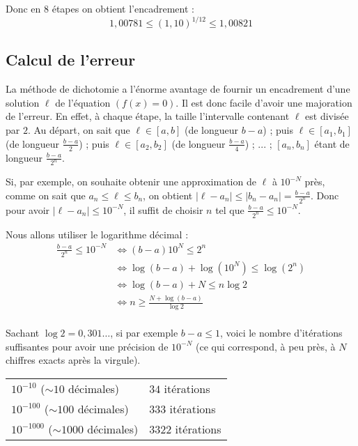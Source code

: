 \documentclass[class=report,crop=false]{standalone}
\begin{document}
Donc en $8$ étapes on obtient l'encadrement :
$$ 1,00781 \le (1,10)^{1/12} \le 1,00821$$



\subsection{Calcul de l'erreur}

La méthode de dichotomie a l'énorme avantage de fournir un encadrement d'une solution $\ell$ de l'équation $(f(x)=0)$.
Il est donc facile d'avoir une majoration de l'erreur. En effet, à chaque étape,
la taille l'intervalle contenant $\ell$ est divisée par $2$.
Au départ, on sait que $\ell \in [a,b]$ (de longueur $b-a$) ;
puis $\ell  \in [a_1,b_1]$ (de longueur $\frac{b-a}{2}$) ;
puis $\ell \in [a_2,b_2]$ (de longueur $\frac{b-a}{4}$) ; ... ;
$[a_n,b_n]$ étant de longueur $\frac{b-a}{2^n}$.


Si, par exemple, on souhaite obtenir une approximation de $\ell$ à $10^{-N}$ près,
comme on sait que $a_n \le \ell \le b_n$, on obtient $|\ell-a_n| \le |b_n-a_n| = \frac{b-a}{2^n}$.
Donc pour avoir $|\ell-a_n| \le 10^{-N}$, il suffit de choisir $n$ tel que  $\frac{b-a}{2^n} \le 10^{-N}$.

Nous allons utiliser le logarithme décimal :
\begin{align*}
\frac{b-a}{2^n} \le 10^{-N}
 & \iff (b-a)10^N \le 2^n  \\
 & \iff \log(b-a) + \log(10^N)  \le \log(2^n) \\
 & \iff \log(b-a) + N \le n \log 2 \\
 & \iff n \ge \frac{N +  \log(b-a)}{\log 2} \\
\end{align*}

Sachant $\log 2 = 0,301\ldots$, si par exemple $b-a \le 1$, voici le nombre d'itérations suffisantes pour avoir une  précision de $10^{-N}$ (ce qui correspond, à peu près, à $N$ chiffres exacts après la virgule).
\begin{center}
\begin{tabular}{ll}
  $10^{-10}$ ($\sim 10$ décimales) &  $34$ itérations \\
  $10^{-100}$ ($\sim 100$ décimales) &  $333$ itérations \\
  $10^{-1000}$ ($\sim 1000$ décimales) &  $3322$ itérations \\
\end{tabular}
\end{center}
\end{document}
